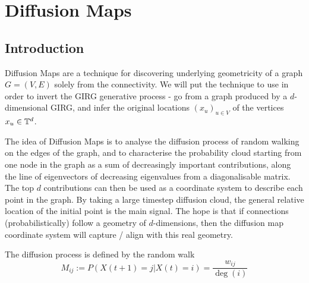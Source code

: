 \chapter{Diffusion Maps}
\section{Introduction}

Diffusion Maps are a technique for discovering underlying geometricity of a graph $G=(V,E)$ solely from the connectivity. We will put the technique to use in order to invert the GIRG generative process - go from a graph produced by a $d$-dimensional GIRG, and infer the original locations $(x_u)_{u\in V}$ of the vertices $x_u \in \mathbb{T}^d$.

The idea of Diffusion Maps is to analyse the diffusion process of random walking on the edges of the graph, and to characterise the probability cloud starting from one node in the graph as a sum of decreasingly important contributions, along the line of eigenvectors of decreasing eigenvalues from a diagonalisable matrix. The top $d$ contributions can then be used as a coordinate system to describe each point in the graph. By taking a large timestep diffusion cloud, the general relative location of the initial point is the main signal. The hope is that if connections (probabilistically) follow a geometry of $d$-dimensions, then the diffusion map coordinate system will capture / align with this real geometry.

The diffusion process is defined by the random walk 
\begin{equation}
  M_{ij} := P(X(t+1) = j | X(t)=i) = \frac{w_{ij}}{\deg(i)}
\end{equation}

